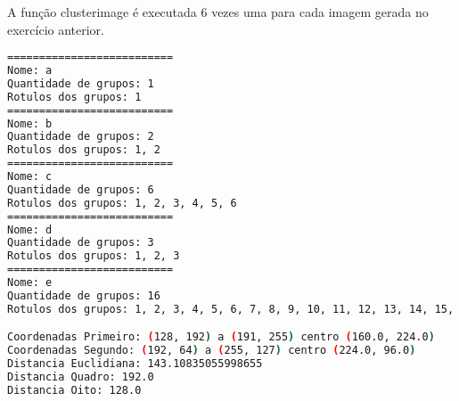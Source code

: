\documentclass{article}
\begin{document}
\begin{flushleft}
A função {\ttfamily cluster\textunderscore image} é executada 6 vezes uma para cada imagem gerada no exercício anterior.
\end{flushleft}

\begin{lstlisting}[language=Bash]
==========================
Nome: a
Quantidade de grupos: 1
Rotulos dos grupos: 1
==========================
Nome: b
Quantidade de grupos: 2
Rotulos dos grupos: 1, 2
==========================
Nome: c
Quantidade de grupos: 6
Rotulos dos grupos: 1, 2, 3, 4, 5, 6
==========================
Nome: d
Quantidade de grupos: 3
Rotulos dos grupos: 1, 2, 3
==========================
Nome: e
Quantidade de grupos: 16
Rotulos dos grupos: 1, 2, 3, 4, 5, 6, 7, 8, 9, 10, 11, 12, 13, 14, 15, 16

Coordenadas Primeiro: (128, 192) a (191, 255) centro (160.0, 224.0)
Coordenadas Segundo: (192, 64) a (255, 127) centro (224.0, 96.0)
Distancia Euclidiana: 143.10835055998655
Distancia Quadro: 192.0
Distancia Oito: 128.0
\end{lstlisting}
\end{document}
